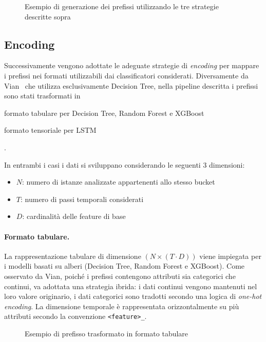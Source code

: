 \begin{figure}[htbp]
    \centering
    
    \caption{Esempio di generazione dei prefissi utilizzando le tre strategie descritte sopra}
    \label{fig:encoding_strategies}
\end{figure}

\subsection{Encoding}
\label{subsec:encoding}
Successivamente vengono adottate le adeguate strategie di \textit{encoding} per mappare i prefissi nei formati utilizzabili dai classificatori considerati. Diversamente da Vian~\cite{ppm-human-centered-vian2024} che utilizza esclusivamente Decision Tree, nella pipeline descritta i prefissi sono stati trasformati in
\begin{enumerate*}[label=(\roman*)]
    \item formato tabulare per Decision Tree, Random Forest e XGBoost
    \item formato tensoriale per LSTM
\end{enumerate*}.

In entrambi i casi i dati si sviluppano considerando le seguenti 3 dimensioni:
\begin{itemize}
    \item $N$: numero di istanze analizzate appartenenti allo stesso bucket
    \item $T$: numero di passi temporali considerati
    \item $D$: cardinalità delle feature di base
\end{itemize}


\paragraph{Formato tabulare.}
La rappresentazione tabulare di dimensione $(N \times (T \cdot D))$ viene impiegata per i modelli basati su alberi (Decision Tree, Random Forest e XGBoost). Come osservato da Vian, poiché i prefissi contengono attributi sia categorici che continui, va adottata una strategia ibrida: i dati continui vengono mantenuti nel loro valore originario, i dati categorici sono tradotti secondo una logica di \textit{one-hot encoding}. La dimensione temporale è rappresentata orizzontalmente su più attributi secondo la convenzione \texttt{<feature>\_<step t>}.
\begin{figure}[H]
    \centering
    
    \caption{Esempio di prefisso trasformato in formato tabulare}
    \label{fig:tabular_format}
\end{figure}

